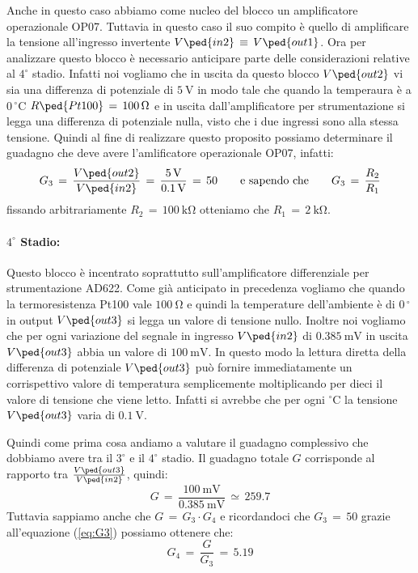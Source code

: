 Anche in questo caso abbiamo come nucleo del blocco un amplificatore operazionale OP07. Tuttavia in questo caso il suo compito è quello di amplificare la tensione all'ingresso invertente $V\ped{in2}\,\equiv\,V\ped{out1}$. Ora per analizzare questo blocco è necessario anticipare parte delle considerazioni relative al $4^\circ$ stadio. Infatti noi vogliamo che in uscita da questo blocco $V\ped{out2}$ vi sia una differenza di potenziale di $\SI{5}{\volt}$ in modo tale che quando la temperaura è a $0\,^\circ$C $R\ped{Pt100}\,=\,\SI{100}{\ohm}$ e in uscita dall'amplificatore per strumentazione si legga una differenza di potenziale nulla, visto che i due ingressi sono alla stessa tensione.
Quindi al fine di realizzare questo proposito possiamo determinare il guadagno che deve avere l'amlificatore operazionale OP07, infatti:
\begin{equation}
	G_3\,=\,\frac{V\ped{out2}}{V\ped{in2}}\,=\,\frac{\SI{5}{\volt}}{\SI{0.1}{\volt}}\,=\, 50
	\qquad \text{e sapendo che} \qquad
	G_3\,=\,\frac{R_2}{R_1}
	\label{eq:G3}
\end{equation}
fissando arbitrariamente $R_2\,=\,\SI{100}{\kilo\ohm}$ otteniamo che $R_1\,=\,\SI{2}{\kilo\ohm}$.

\paragraph*{$4^\circ$ Stadio:}

Questo blocco è incentrato soprattutto sull'amplificatore differenziale per strumentazione AD622. Come già anticipato in precedenza vogliamo che quando la termoresistenza Pt100 vale $\SI{100}{\ohm}$ e quindi la temperature dell'ambiente è di $0\,^\circ$ in output $V\ped{out3}$ si legga un valore di tensione nullo.
Inoltre noi vogliamo che per ogni variazione del segnale in ingresso $V\ped{in2}$ di $\SI{0.385}{\milli\volt}$ in uscita $V\ped{out3}$ abbia un valore di $\SI{100}{\milli\volt}$. In questo modo la lettura diretta della differenza di potenziale $V\ped{out3}$ può fornire immediatamente un corrispettivo valore di temperatura semplicemente moltiplicando per dieci il valore di tensione che viene letto. Infatti si avrebbe che per ogni $^\circ$C la tensione $V\ped{out3}$ varia di $\SI{0.1}{\volt}$.

Quindi come prima cosa andiamo a valutare il guadagno complessivo che dobbiamo avere tra il $3^\circ$ e il $4^\circ$ stadio. Il guadagno totale $G$ corrisponde al rapporto tra $\frac{V\ped{out3}}{V\ped{in2}}$, quindi:
\begin{equation}
	G\,=\,\frac{\SI{100}{\milli\volt}}{\SI{0.385}{\milli\volt}}\,\simeq\,259.7
\end{equation}
Tuttavia sappiamo anche che $G\,=\,G_3 \cdot G_4$ e ricordandoci che $G_3\,=\,50$ grazie all'equazione (\ref{eq:G3}) possiamo ottenere che:
\begin{equation}
	G_4\,=\,\frac{G}{G_3}\,=\,5.19
\end{equation}


